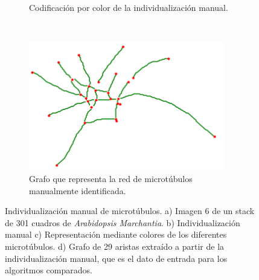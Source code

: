 \begin{figure}[h!]
\begin{subfigure}[t]{0.49\textwidth}
        \caption{Codificaci\'on por color de la individualizaci\'on manual.}
        \label{fig:SpinningMarchantia-indivManual}
    \end{subfigure}
    ~
    \begin{subfigure}[t]{0.49\textwidth}
        \centering
        \includegraphics[height=2.2in]{benchImages/50-ROIs-Spinning-Marchantia-graph-og.png}
        \caption{Grafo que representa la red de microt\'ubulos manualmente identificada.}
        \label{fig:SpinningMarchantia-graph}
    \end{subfigure}
    \caption{Individualizaci\'on manual de microt\'ubulos. a) Imagen 6 de un stack de 301 cuadros de {\it Arabidopsis Marchantia}. b) Individualizaci\'on manual c) Representaci\'on mediante colores de los diferentes microt\'ubulos. d) Grafo de 29 aristas extra\'ido a partir de la individualizaci\'on manual, que es el dato de entrada para los algoritmos comparados.}
    \label{fig:SpinningMarchantia}
\end{figure}



